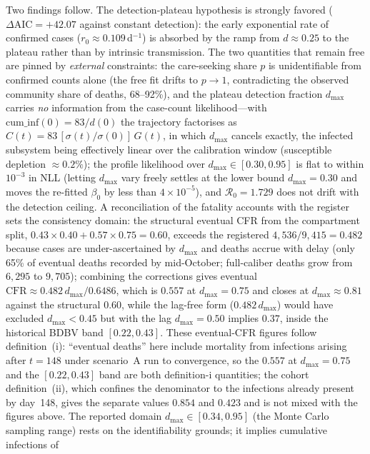 \documentclass[10pt]{plos}
\newcommand{\Reff}{\mathcal{R}}
\begin{document}
Two findings follow. The detection-plateau hypothesis is strongly
favored ($\Delta\mathrm{AIC}=+42.07$ against constant detection): the
early exponential rate of confirmed cases ($r_0\approx0.109\,$d$^{-1}$)
is absorbed by the ramp from $d\approx0.25$ to the plateau rather than
by intrinsic transmission. The two quantities that remain free are
pinned by \emph{external} constraints: the care-seeking share $p$ is
unidentifiable from confirmed counts alone (the free fit drifts to
$p\to1$, contradicting the observed community share of deaths,
68--92\%), and the plateau detection fraction $d_{\max}$ carries
\emph{no} information from the case-count likelihood---with
$\mathrm{cum\_inf}(0)=83/d(0)$ the trajectory factorises as
$C(t)=83\,[\sigma(t)/\sigma(0)]\,G(t)$, in which $d_{\max}$ cancels
exactly, the infected subsystem being effectively linear over the
calibration window (susceptible depletion $\approx0.2\%$); the profile
likelihood over $d_{\max}\in[0.30,0.95]$ is flat to within $10^{-3}$ in
NLL (letting $d_{\max}$ vary freely settles at the lower bound
$d_{\max}=0.30$ and moves the re-fitted $\beta_0$ by less than
$4\times10^{-5}$), and $\Reff_0=1.729$ does not drift with the
detection ceiling. A reconciliation of the fatality accounts with the
register sets the consistency domain: the structural eventual CFR from
the compartment split,
$0.43\times0.40+0.57\times0.75=0.60$, exceeds the registered
$4{,}536/9{,}415=0.482$ because cases are under-ascertained by
$d_{\max}$ and deaths accrue with delay (only 65\% of eventual deaths
recorded by mid-October; full-caliber deaths grow from $6{,}295$ to
$9{,}705$); combining the corrections gives eventual
$\mathrm{CFR}\approx0.482\,d_{\max}/0.6486$, which is $0.557$ at
$d_{\max}=0.75$ and closes at $d_{\max}\approx0.81$ against the
structural $0.60$, while the lag-free form ($0.482\,d_{\max}$) would
have excluded $d_{\max}<0.45$ but with the lag $d_{\max}=0.50$ implies
$0.37$, inside the historical BDBV band $[0.22,0.43]$. These
eventual-CFR figures follow definition~(i): ``eventual deaths'' here
include mortality from infections arising after $t=148$ under scenario~A
run to convergence, so the $0.557$ at $d_{\max}=0.75$ and the
$[0.22,0.43]$ band are both definition-i quantities; the cohort
definition~(ii), which confines the denominator to the infections already
present by day~148, gives the separate values $0.854$ and $0.423$ and is
not mixed with the figures above. The reported
domain $d_{\max}\in[0.34,0.95]$ (the Monte Carlo sampling range) rests
on the identifiability grounds; it implies cumulative infections of
\end{document}
